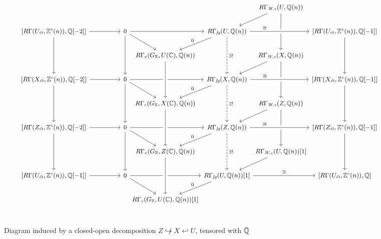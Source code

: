 \documentclass{article}
\numberwithin{equation}{section}
\begin{document}
\begin{landscape}
  \begin{figure}
    \[ \begin{tikzcd}[font=\small]
        &[2em] &[-2.5em] &[-2.5em] &[-2.5em] R\Gamma_\Wc (U, \QQ (n))\ar{dl}\ar{dd} &[-2.5em] \\
        {[R\Gamma (U_\et, \ZZ^c (n)), \QQ[-2]]} \ar{r}\ar{dd} & 0 \ar{dr} \ar{dd} \ar{rr} & & R\Gamma_\fg (U, \QQ (n))\ar{dl}[swap]{0} \ar[dashed]{dd}{\exists!} \ar[crossing over,near start]{rr}{\cong} & & {[R\Gamma (U_\et, \ZZ^c (n)), \QQ[-1]]} \ar{dd} \\
        & & R\Gamma_c (G_\RR, U (\CC), \QQ (n)) & & R\Gamma_\Wc (X, \QQ (n))\ar{dl}\ar{dd} \\
        {[R\Gamma (X_\et, \ZZ^c (n)), \QQ[-2]]} \ar{r}\ar{dd} & 0 \ar{dr} \ar{dd} \ar{rr} & & R\Gamma_\fg (X, \QQ (n)) \ar{dl}[swap]{0} \ar[dashed]{dd}{\exists!} \ar[crossing over,near start]{rr}{\cong} & & {[R\Gamma (X_\et, \ZZ^c (n)), \QQ[-1]]} \ar{dd} \\
        & & R\Gamma_c (G_\RR, X (\CC), \QQ (n)) \ar[<-,near end,crossing over]{uu} & & R\Gamma_\Wc (Z, \QQ (n))\ar{dl}\ar{dd} \\
        {[R\Gamma (Z_\et, \ZZ^c (n)), \QQ[-2]]} \ar{r}\ar{dd} & 0 \ar{dr} \ar{dd} \ar{rr} & & R\Gamma_\fg (Z, \QQ (n)) \ar{dl}[swap]{0} \ar[dashed]{dd}{\exists!} \ar[crossing over,near start]{rr}{\cong} & & {[R\Gamma (Z_\et, \ZZ^c (n)), \QQ[-1]]} \ar{dd} \\
        & & R\Gamma_c (G_\RR, Z (\CC), \QQ (n)) \ar[<-,near end,crossing over]{uu} & & R\Gamma_\Wc (U, \QQ (n)) [1]\ar{dl} \\
        {[R\Gamma (U_\et, \ZZ^c (n)), \QQ[-1]]} \ar{r} & 0 \ar{dr} \ar{rr} & & R\Gamma_\fg (U, \QQ (n)) [1] \ar{dl}[swap]{0} \ar{rr}{\cong} & & {[R\Gamma (U_\et, \ZZ^c (n)), \QQ]} \\
        & & R\Gamma_c (G_\RR, U (\CC), \QQ (n)) [1] \ar[<-,near end,crossing over]{uu} \\
      \end{tikzcd} \]

    \caption{Diagram induced by a closed-open decomposition
      $Z \not\hookrightarrow X \hookleftarrow U$, tensored with $\mathbb{Q}$}
    \label{fig:RGamma-Wc-and-closed-open-decompositions-otimes-Q}
  \end{figure}
\end{landscape}
\end{document}
